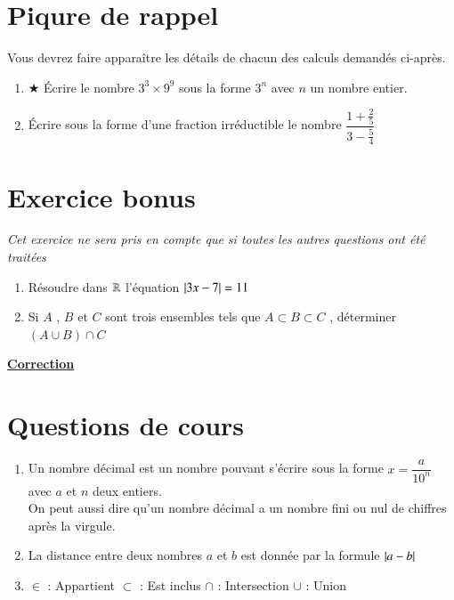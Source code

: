 \documentclass[oneside,12pt]{exam}          %
\begin{document}
\section{Piqure de rappel}
Vous devrez faire apparaître les détails de chacun des calculs demandés ci-après.
\begin{enumerate}
	\item $\bigstar$ Écrire le nombre $3^3 \times 9^9$ sous la forme $3^n$ avec $n$ un nombre entier.
	\item Écrire sous la forme d'une fraction irréductible le nombre $\dfrac{1 + \frac{2}{5}}{3 - \frac{5}{4}}$
\end{enumerate}



\section*{Exercice bonus}
\textit{Cet exercice ne sera pris en compte que si toutes les autres questions ont été traitées}
\begin{enumerate}
	\item Résoudre dans ${\mathbb R}$ l'équation ${\left\lvert 3x-7 \right\rvert} = 11$
	\item Si $A$ , $B$ et $C$ sont trois ensembles tels que $A \subset B \subset C$ , déterminer $(A \cup B) \cap C$
\end{enumerate}



\newpage
\setcounter{section}{0}
\color{newblue}


\begin{center}
	\Large \textbf{\underline{Correction}}
\end{center}

\section{Questions de cours}
\begin{enumerate}
	\item Un nombre décimal est un nombre pouvant s'écrire sous la forme $x = \dfrac{a}{10^n}$ avec $a$ et $n$ deux entiers. \\
	On peut aussi dire qu'un nombre décimal a un nombre fini ou nul de chiffres après la virgule.
	\item La distance entre deux nombres $a$ et $b$ est donnée par la formule ${\left\lvert a-b \right\rvert}$
	\item $\in$ : Appartient \qquad  $\subset$ : Est inclus \qquad  $\cap$ : Intersection \qquad  $\cup$ : Union
\end{enumerate}
\end{document}
